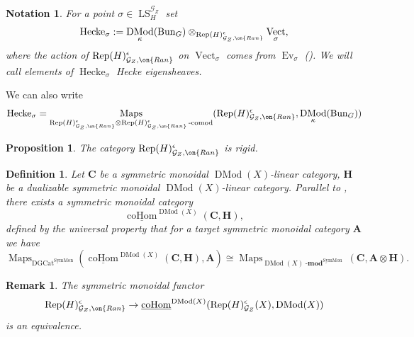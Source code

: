 \documentclass[9pt]{amsart}
\newcommand{\cG}{{\mathcal G}}
\newcommand{\Ranp}{{\on{Ran}}}
\DeclareMathOperator{\DGCat}{{DGCat}}
\DeclareMathOperator{\Maps}{{Maps}}
\DeclareMathOperator{\LocSys}{{LS}}
\DeclareMathOperator{\bfmod}{{-\mathbf{mod}}}
\DeclareMathOperator{\Vect}{{Vect}}
\DeclareMathOperator{\Rep}{{Rep}}
\newtheorem{pr}[subsubsection]{Proposition}
\newtheorem{df}[subsubsection]{Definition}
\newtheorem{rem}[subsubsection]{Remark}
\newtheorem{ntn}[subsubsection]{Notation}
\numberwithin{equation}{section}
\DeclareMathOperator{\D}{{DMod}}
\begin{document}
\begin{ntn}
	For a point $\sigma \in \LocSys_H^{\cG_Z}$ set $$\operatorname{Hecke}_{\sigma}:= \D_{\kappa}(\Bun_G) \otimes_{\Rep(H)_{\cG_Z, \Ranp}^{\epsilon}} \Vect_{\sigma},$$
	where the action of $\Rep(H)_{\cG_Z, \Ranp}^{\epsilon}$ on $\Vect_{\sigma}$ comes from $\operatorname{Ev}_{\sigma}$ (\cite[9.5.3]{GL}). We will call elements of $\operatorname{Hecke}_{\sigma}$ \emph{Hecke eigensheaves}.
\end{ntn}

We can also write
\begin{equation}
\operatorname{Hecke}_{\sigma} = \Maps_{\Rep(H)_{\cG_Z, \Ranp}^{\epsilon} \otimes \Rep(H)_{\cG_Z, \Ranp}^{\epsilon} \operatorname{-comod}}(\Rep(H)_{\cG_Z, \Ranp}^{\epsilon}, \D_{\kappa}(\Bun_G))
\end{equation}
\begin{pr}\label{rigid}
	The category  $\Rep(H)_{\cG_Z, \Ranp}^{\epsilon}$ is rigid.
\end{pr}

\begin{df}
	Let $\mathbf{C}$ be a symmetric monoidal $\D(X)$-linear category, $\mathbf{H}$ be a dualizable symmetric monoidal $\D(X)$-linear category. Parallel to \cite[8.2]{AGKRRV}, there exists a symmetric monoidal category $$\underline{\operatorname{coHom}}^{\D(X)}(\mathbf{C}, \mathbf{H}),$$
	defined by the universal property that for a target symmetric monoidal category $\mathbf{A}$ we have 
$$\Maps_{\DGCat^{\operatorname{SymMon}}}(\underline{\operatorname{coHom}}^{\D(X)}(\mathbf{C}, \mathbf{H}), \mathbf{A}) \cong \Maps_{\D(X)\bfmod^{\operatorname{SymMon}}}(\mathbf{C}, \mathbf{A}\otimes \mathbf{H}).$$
\end{df}

\begin{rem}\cite[11.1.9]{AGKRRV}\label{coHom}
	The symmetric monoidal functor 
	$$\Rep(H)_{\cG_Z, \Ranp}^{\epsilon} \rightarrow \underline{\operatorname{coHom}}^{\D(X)}(\Rep(H)_{\cG_Z}^{\epsilon}(X), \D(X))$$
	is an equivalence.
\end{rem}
\end{document}
